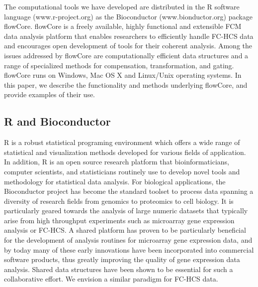 \documentclass[12pt]{article}
\begin{document}
The computational tools we have developed are distributed in the R 
software language (www.r-project.org) as the Bioconductor
(www.bionductor.org) package flowCore. flowCore is a freely available, highly
functional and extensible FCM data analysis platform that 
enables researchers to efficiently handle FC-HCS data and encourages open
development of tools for their coherent analysis. Among the issues
addressed by flowCore are computationally efficient data structures and
a range of specialized methods for compensation, transformation, and gating. 
flowCore runs on Windows, Mac OS X and Linux/Unix operating
systems.  In this paper, we describe the functionality and methods underlying flowCore, 
and provide examples of their use.


\subsection*{R and Bioconductor}
R is a robust statistical programing environment which offers a wide
range of statistical and visualization methods developed for various
fields of application. In addition, R is an open source research %
platform that bioinformaticians, computer scientists, and
statisticians routinely use to develop novel tools and methodology for
statistical data analysis. For biological applications, the
Bioconductor project has become the standard toolset
\citep{gentleman2006bos} to process data spanning a diversity of
research fields from genomics to proteomics to cell
biology. It is particularly geared towards the analysis of large
numeric datasets that typically arise from high throughput experiments
such as microarray gene expression analysis or FC-HCS. A shared
platform has proven to be particularly beneficial for the development of
analysis routines for microarray gene expression data, and by today
many of these early innovations have been incorporated into commercial
software products, thus greatly improving the quality of gene
expression data analysis. 
Shared data structures have been shown to be
essential for such a collaborative effort. We envision a similar
paradigm for FC-HCS data. 
\end{document}
